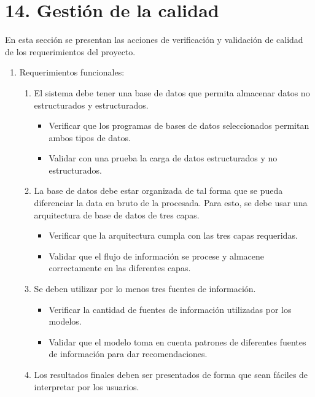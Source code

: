 \documentclass[
11pt, %
codirector, %
]{charter}
\begin{document}
\section{14. Gestión de la calidad}
\label{sec:calidad}

En esta sección se presentan las acciones de verificación y validación de calidad de los requerimientos del proyecto.

\begin{enumerate}
	\item Requerimientos funcionales:
		\begin{enumerate}
			\item El sistema debe tener una base de datos que permita almacenar datos no estructurados y estructurados.
                    \begin{itemize}
                    	\item Verificar que los programas de bases de datos seleccionados permitan ambos tipos de datos.
                    	\item Validar con una prueba la carga de datos estructurados y no estructurados.
                    \end{itemize}
                \item La base de datos debe estar organizada de tal forma que se pueda diferenciar la data en bruto de la procesada. Para esto, se debe usar una arquitectura de base de datos de tres capas.
                    \begin{itemize}
                    	\item Verificar que la arquitectura cumpla con las tres capas requeridas.
                    	\item Validar que el flujo de información se procese y almacene correctamente en las diferentes capas.
                    \end{itemize}
			\item Se deben utilizar por lo menos tres fuentes de información.
                    \begin{itemize}
                    	\item Verificar la cantidad de fuentes de información utilizadas por los modelos.
                    	\item Validar que el modelo toma en cuenta patrones de diferentes fuentes de información para dar recomendaciones.
                    \end{itemize}
			\item Los resultados finales deben ser presentados de forma que sean fáciles de interpretar por los usuarios.

\end{enumerate}
\end{enumerate}
\end{document}
